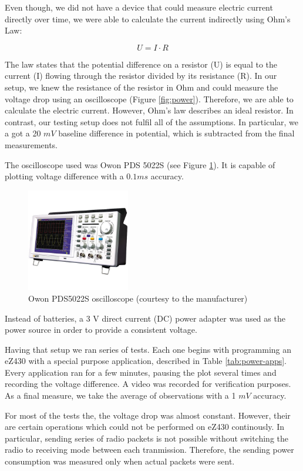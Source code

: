 Even though, we did not have a device that could measure electric current directly over time, we were able to calculate the current indirectly using Ohm's Law: 

$$
U = I \cdot R
$$

The law states that the potential difference on a resistor (U) is equal to the current (I) flowing through the resistor divided by its resistance (R).
In our setup, we knew the resistance of the resistor in Ohm and could measure the voltage drop using an oscilloscope (Figure \ref{fig:power}).
Therefore, we are able to calculate the electric current.
However, Ohm's law describes an ideal resistor.
In contrast, our testing setup does not fulfil all of the assumptions.
In particular, we a got a 20 $mV$ baseline difference in potential, which is subtracted from the final measurements.

The oscilloscope used was Owon PDS 5022S (see Figure \ref{fig:owon}).
It is capable of plotting voltage difference with a $ 0.1 ms$ accuracy.

\begin{figure}[h]
  \centering
  \includegraphics[width=0.4\textwidth]{img/owon_pds5022s.jpg}
  \caption{Owon PDS5022S oscilloscope (courtesy to the manufacturer)}
  \label{fig:owon}
\end{figure}

Instead of batteries, a 3 V direct current (DC) power adapter was used as the power source in order to provide a consistent voltage.

Having that setup we ran series of tests.
Each one begins with programming an eZ430 with a special purpose application, described in Table \ref{tab:power-apps}.
Every application ran for a few minutes, pausing the plot several times and recording the voltage difference.
A video was recorded for verification purposes.
As a final measure, we take the average of observations with a 1 $ mV $ accuracy.

For most of the tests the, the voltage drop was almost constant.
However, their are certain operations which could not be performed on eZ430 continously.
In particular, sending series of radio packets is not possible without switching the radio to receiving mode between each tranmission.
Therefore, the sending power consumption was measured only when actual packets were sent.

